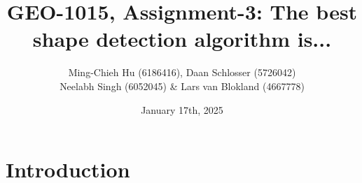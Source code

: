 \documentclass[a4paper,9pt]{article}
\title{GEO-1015, Assignment-3: The best shape detection algorithm is...}
\author{Ming-Chieh Hu (6186416), Daan Schlosser (5726042) \\ 
        Neelabh Singh (6052045) \& Lars van Blokland (4667778)}
\date{January 17th, 2025}
\begin{document}
\maketitle

\tableofcontents
\newpage






        






\section{Introduction}
\end{document}
